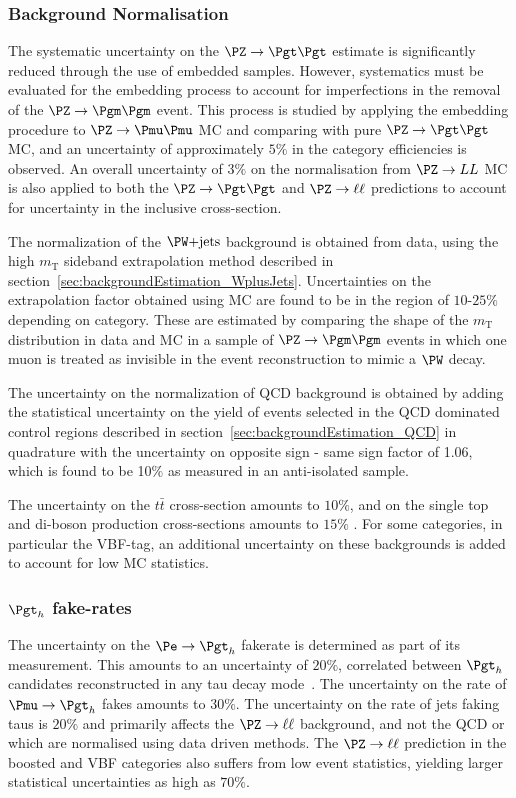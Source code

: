 \subsubsection{\textbf{Background Normalisation}}
The systematic uncertainty on the $\ZToTauTau$ estimate is significantly reduced
through the use of embedded samples. However, systematics must be evaluated for
the embedding process to account for imperfections in the removal of the
$\PZ\to\Pgm\Pgm$ event. This process is studied by applying the embedding
procedure to $\PZ\to\Pmu\Pmu$ \ac{MC} and comparing with pure $\ZToTauTau$
\ac{MC}, and an uncertainty of approximately $5\%$ in the category efficiencies
is observed. An overall uncertainty of $3\%$ on the normalisation from
$\PZ\to LL$ \ac{MC} is also applied to both the $\ZToTauTau$ and
$\PZ\to\ell\ell$ predictions to account for uncertainty in the inclusive
cross-section.

The normalization of the $\WJets$ background is obtained from data, 
using the high $m_{\text{T}}$ sideband extrapolation method described in
section~\ref{sec:backgroundEstimation_WplusJets}. Uncertainties on the
extrapolation factor obtained using \ac{MC} are found to be in the region of
$10$-$25\%$ depending on category. These are estimated by comparing the shape of
the $m_{\text{T}}$ distribution in data and \ac{MC} in a sample of
$\PZ\to\Pgm\Pgm$ events in which one muon is treated as invisible in the event
reconstruction to mimic a $\PW$ decay. 

The uncertainty on the normalization of QCD background is obtained by adding the
statistical uncertainty on the yield of events selected in the QCD dominated control regions
described in section~\ref{sec:backgroundEstimation_QCD} in quadrature with the
uncertainty on opposite sign - same sign factor of 1.06, which is found to be
10$\%$ as measured in an anti-isolated sample.

The uncertainty on the $t \bar{t}$ cross-section amounts to $10\%$, and on the single top and di-boson
production cross-sections amounts to $15\%$
\cite{Chatrchyan:2013oev,Chatrchyan:2012ep}. For some categories, in particular
the VBF-tag, an additional uncertainty on these backgrounds is added to account
for low \ac{MC} statistics.  
 
\subsubsection{\textbf{$\Pgt_{h}$ fake-rates}} 
The uncertainty on the $\Pe \to \Pgt_{h}$ fakerate is determined as part of
its measurement. This amounts to an uncertainty of $20\%$, correlated between
$\Pgt_{h}$ candidates reconstructed in any tau decay mode~\cite{HIG-13-004}. 
The uncertainty on the rate of $\Pmu \to \Pgt_{h}$ fakes amounts to $30\%$.
The uncertainty on the rate of jets faking taus is $20\%$ and primarily affects
the $\PZ\to\ell\ell$ background, and not the QCD or \WJets which are normalised
using data driven methods. The $\PZ\to\ell\ell$ prediction in the boosted and
VBF categories also suffers from low event statistics, yielding larger
statistical uncertainties as high as $70\%$.

